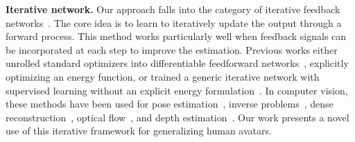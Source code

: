 \textbf{Iterative network.} Our approach falls into the category of iterative feedback networks~\citep{adler2017solving, manhardt2018deep, carreira2016human, li2018deepim, ma2020deep}. 
The core idea is to learn to iteratively update the output through a forward process. This method works particularly well when feedback signals can be incorporated at each step to improve the estimation. Previous works either unrolled standard optimizers into differentiable feedforward networks~\citep{wang2016proximal, belanger2016structured, schwing2015fully, zuo2025ogni}, explicitly optimizing an energy function, or trained a generic iterative network with supervised learning without an explicit energy formulation~\citep{andrychowicz2016learning, wichrowska2017learned, flynn2019deepview, teed2020raft}. In computer vision, these methods have been used for pose estimation~\citep{li2018deepim, carreira2016human}, inverse problems~\citep{ma2020deep}, dense reconstruction~\citep{flynn2019deepview}, optical flow~\citep{teed2020raft}, and depth estimation~\citep{zuo2025ogni}. 
Our work presents a novel use of this iterative framework for generalizing human avatars.


